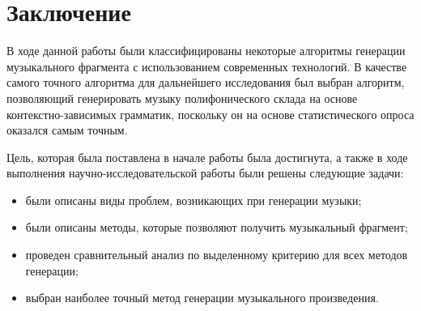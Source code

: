 \chapter*{Заключение}

В ходе данной работы были классифицированы некоторые алгоритмы генерации музыкального фрагмента с использованием современных технологий. В качестве самого точного алгоритма для дальнейшего исследования был выбран алгоритм, позволяющий генерировать музыку полифонического склада на основе контекстно-зависимых грамматик, поскольку он на основе статистического опроса оказался самым точным.

Цель, которая была поставлена в начале работы была достигнута, а также в ходе выполнения научно-исследовательской работы были решены следующие задачи:

\begin{itemize}
	\item были описаны виды проблем, возникающих при генерации музыки;
    \item были описаны методы, которые позволяют получить музыкальный фрагмент;
	\item проведен сравнительный анализ по выделенному критерию для всех методов генерации;
	\item выбран наиболее точный метод генерации музыкального произведения.
\end{itemize}